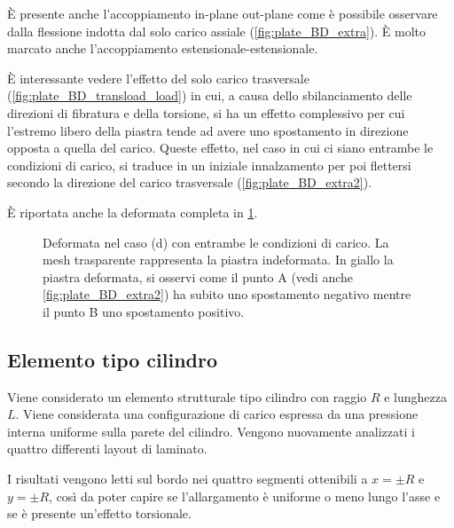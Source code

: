 \documentclass[a4paper,num-refs]{oup-contemporary}
\begin{document}
È presente anche l'accoppiamento in-plane out-plane come è possibile osservare dalla flessione indotta dal solo carico assiale (\cref{fig:plate_BD_extra}).  È molto marcato anche l'accoppiamento estensionale-estensionale. 

È interessante vedere l'effetto del solo carico trasversale (\cref{fig:plate_BD_transload_load}) in cui, a causa dello sbilanciamento delle direzioni di fibratura e della torsione, si ha un effetto complessivo per cui l'estremo libero della piastra tende ad avere uno spostamento in direzione opposta a quella del carico.  Queste effetto, nel caso in cui ci siano entrambe le condizioni di carico, si traduce in un iniziale innalzamento per poi flettersi secondo la direzione del carico trasversale (\cref{fig:plate_BD_extra2}). 

È riportata anche la deformata completa in \cref{fig:deformata_D}.

\begin{figure}[bt!]
	\caption{Deformata nel caso (d) con entrambe le condizioni di carico. La mesh trasparente rappresenta la piastra indeformata. In giallo la piastra deformata, si osservi come il punto A  (vedi anche \cref{fig:plate_BD_extra2}) ha subito uno spostamento negativo mentre il punto B uno spostamento positivo.}
	\label{fig:deformata_D}
\end{figure}

\subsection{Elemento tipo cilindro}

Viene considerato un elemento strutturale tipo cilindro con raggio $R$ e lunghezza $L$. Viene considerata una configurazione di carico espressa da una pressione interna uniforme sulla parete del cilindro. Vengono nuovamente analizzati i quattro differenti layout di laminato.

I risultati vengono letti sul bordo nei quattro segmenti ottenibili a $x=\pm R$ e $y=\pm R$, così da poter capire se l'allargamento è uniforme o meno lungo l'asse e se è presente un'effetto torsionale. 
\end{document}
